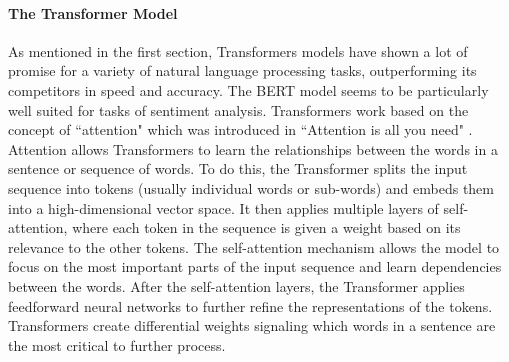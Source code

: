 \documentclass[12pt, letterpaper, titlepage]{article}
\begin{document}
\paragraph{The Transformer Model}
As mentioned in the first section, Transformers models have shown a lot of promise for a variety of natural language processing tasks, outperforming its competitors in speed and accuracy. The BERT model seems to be particularly well suited for tasks of sentiment analysis. Transformers work based on the concept of ``attention" which was introduced in ``Attention is all you need" \citep{vaswani2017attention}. Attention allows Transformers to learn the relationships between the words in a sentence or sequence of words. To do this, the Transformer splits the input sequence into tokens (usually individual words or sub-words) and embeds them into a high-dimensional vector space. It then applies multiple layers of self-attention, where each token in the sequence is given a weight based on its relevance to the other tokens. The self-attention mechanism allows the model to focus on the most important parts of the input sequence and learn dependencies between the words. After the self-attention layers, the Transformer applies feedforward neural networks to further refine the representations of the tokens. Transformers create differential weights signaling which words in a sentence are the most critical to further process. 	
\end{document}
